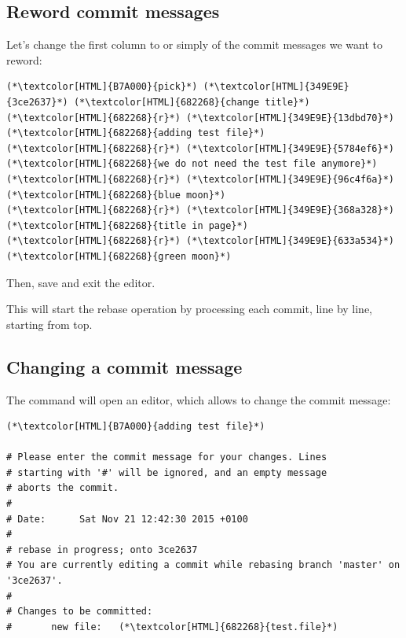 \subsection{Reword commit messages}
\begin{frame}[fragile]
  \subslidetitle

  Let's change the first column to  or simply  of the commit messages we want to reword:
  \begin{lstlisting}
(*\textcolor[HTML]{B7A000}{pick}*) (*\textcolor[HTML]{349E9E}{3ce2637}*) (*\textcolor[HTML]{682268}{change title}*)
(*\textcolor[HTML]{682268}{r}*) (*\textcolor[HTML]{349E9E}{13dbd70}*) (*\textcolor[HTML]{682268}{adding test file}*)
(*\textcolor[HTML]{682268}{r}*) (*\textcolor[HTML]{349E9E}{5784ef6}*) (*\textcolor[HTML]{682268}{we do not need the test file anymore}*)
(*\textcolor[HTML]{682268}{r}*) (*\textcolor[HTML]{349E9E}{96c4f6a}*) (*\textcolor[HTML]{682268}{blue moon}*)
(*\textcolor[HTML]{682268}{r}*) (*\textcolor[HTML]{349E9E}{368a328}*) (*\textcolor[HTML]{682268}{title in page}*)
(*\textcolor[HTML]{682268}{r}*) (*\textcolor[HTML]{349E9E}{633a534}*) (*\textcolor[HTML]{682268}{green moon}*)
\end{lstlisting}
  Then, save and exit the editor.

  \vspace{1em}
  This will start the rebase operation by processing each commit, line by line, starting from top.

\end{frame}

\subsection{Changing a commit message}
\begin{frame}[fragile]
  \subslidetitle

  The  command will open an editor, which allows to change the commit message:
  \begin{lstlisting}
(*\textcolor[HTML]{B7A000}{adding test file}*)

# Please enter the commit message for your changes. Lines
# starting with '#' will be ignored, and an empty message
# aborts the commit.
#
# Date:      Sat Nov 21 12:42:30 2015 +0100
#
# rebase in progress; onto 3ce2637
# You are currently editing a commit while rebasing branch 'master' on '3ce2637'.
#
# Changes to be committed:
#       new file:   (*\textcolor[HTML]{682268}{test.file}*)
\end{lstlisting}

\end{frame}

